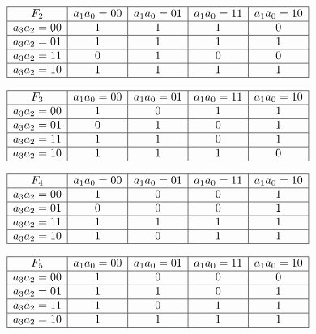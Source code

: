 \begin{center}
$\begin{array}{|c|c|c|c|c|}
\hline
F_2 & a_1a_0=00 & a_1a_0=01 & a_1a_0=11 & a_1a_0=10 \\
\hline
a_3a_2=00  &  1  & 1   & 1   &  0  \\
\hline
a_3a_2=01  &  1  &  1  &  1  &  1  \\
\hline
a_3a_2=11  &  0  & 1   & 0   &  0  \\
\hline
a_3a_2=10  &  1  &  1  &  1  & 1   \\
\hline
\end{array}$
\end{center}

\begin{center}
$\begin{array}{|c|c|c|c|c|}
\hline
F_3 & a_1a_0=00 & a_1a_0=01 & a_1a_0=11 & a_1a_0=10 \\
\hline
a_3a_2=00  &  1  &  0  &  1  &   1 \\
\hline
a_3a_2=01  &  0  &  1  &  0  &  1  \\
\hline
a_3a_2=11  &  1  &  1  &  0  &  1  \\
\hline
a_3a_2=10  &  1  & 1   &  1  & 0   \\
\hline
\end{array}$
\end{center}

\begin{center}
$\begin{array}{|c|c|c|c|c|}
\hline
F_4 & a_1a_0=00 & a_1a_0=01 & a_1a_0=11 & a_1a_0=10 \\
\hline
a_3a_2=00  &  1  &  0  &  0  &  1  \\
\hline
a_3a_2=01  &   0 &  0  &  0  &  1  \\
\hline
a_3a_2=11  &  1  &  1  &  1  &  1  \\
\hline
a_3a_2=10  & 1   &  0  &  1  & 1   \\
\hline
\end{array}$
\end{center}

\begin{center}
$\begin{array}{|c|c|c|c|c|}
\hline
F_5 & a_1a_0=00 & a_1a_0=01 & a_1a_0=11 & a_1a_0=10 \\
\hline
a_3a_2=00  & 1   &  0  &  0  &  0  \\
\hline
a_3a_2=01  &  1  &  1  &  0  &  1  \\
\hline
a_3a_2=11  &  1  &  0  &  1  &  1  \\
\hline
a_3a_2=10  &  1  &  1  & 1   &  1  \\
\hline
\end{array}$
\end{center}

